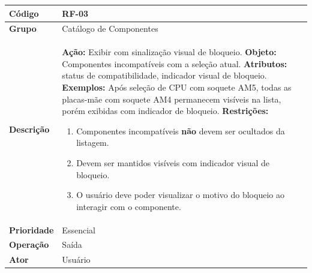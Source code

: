 \FloatBarrier
\begin{quadro}[htb]
  \caption{RF-03 -- Exibir componentes incompatíveis com sinalização visual}
  \label{quad:rf03}
  \begin{tabular}{|p{3.2cm}|p{11.8cm}|}
    \hline
    \textbf{Código}     & RF-03                                                                \\ \hline
    \textbf{Grupo}      & Catálogo de Componentes                                              \\ \hline
    \textbf{Descrição}  &
    \textbf{Ação:} Exibir com sinalização visual de bloqueio.
    \textbf{Objeto:} Componentes incompatíveis com a seleção atual.
    \textbf{Atributos:} status de compatibilidade, indicador visual de bloqueio.
    \textbf{Exemplos:} Após seleção de CPU com soquete AM5, todas as placas-mãe com soquete AM4 permanecem visíveis na lista, porém exibidas com indicador de bloqueio.
    \textbf{Restrições:}
    \begin{enumerate}[nosep,leftmargin=1.2em,topsep=2pt,partopsep=0pt,parsep=0pt,itemsep=1pt]
      \item Componentes incompatíveis \textbf{não} devem ser ocultados da listagem.
      \item Devem ser mantidos visíveis com indicador visual de bloqueio.
      \item O usuário deve poder visualizar o motivo do bloqueio ao interagir com o componente.
    \end{enumerate} \\ \hline
    \textbf{Prioridade} & Essencial                                                            \\ \hline
    \textbf{Operação}   & Saída                                                                \\ \hline
    \textbf{Ator}       & Usuário                                                              \\ \hline
  \end{tabular}
\end{quadro}

